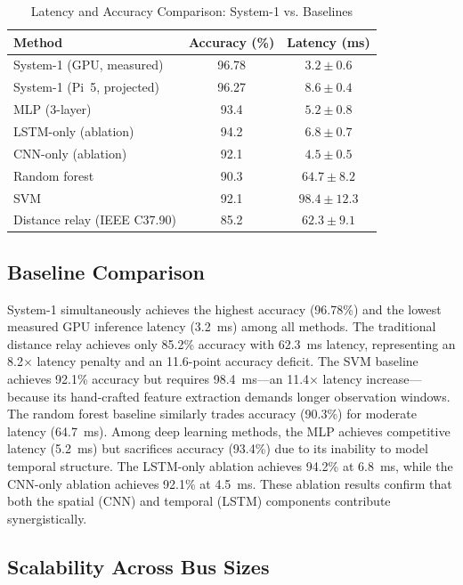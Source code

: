 \documentclass[journal]{IEEEtran}
\begin{document}
\begin{table}[!t]
\centering
\caption{Latency and Accuracy Comparison: System-1 vs. Baselines}
\label{tab:latency}
\begin{tabular}{lcc}
\toprule
\textbf{Method} & \textbf{Accuracy (\%)} & \textbf{Latency (ms)} \\
\midrule
System-1 (GPU, measured)    & 96.78 & $3.2 \pm 0.6$ \\
System-1 (Pi~5, projected)  & 96.27 & $8.6 \pm 0.4$ \\
MLP (3-layer)               & 93.4  & $5.2 \pm 0.8$ \\
LSTM-only (ablation)        & 94.2  & $6.8 \pm 0.7$ \\
CNN-only (ablation)         & 92.1  & $4.5 \pm 0.5$ \\
Random forest               & 90.3  & $64.7 \pm 8.2$ \\
SVM                         & 92.1  & $98.4 \pm 12.3$ \\
Distance relay (IEEE C37.90)& 85.2  & $62.3 \pm 9.1$ \\
\bottomrule
\end{tabular}
\end{table}

\subsection{Baseline Comparison}

System-1 simultaneously achieves the highest accuracy (96.78\%) and the lowest measured GPU inference latency (3.2~ms) among all methods. The traditional distance relay achieves only 85.2\% accuracy with 62.3~ms latency, representing an 8.2$\times$ latency penalty and an 11.6-point accuracy deficit. The SVM baseline achieves 92.1\% accuracy but requires 98.4~ms---an 11.4$\times$ latency increase---because its hand-crafted feature extraction demands longer observation windows. The random forest baseline similarly trades accuracy (90.3\%) for moderate latency (64.7~ms). Among deep learning methods, the MLP achieves competitive latency (5.2~ms) but sacrifices accuracy (93.4\%) due to its inability to model temporal structure. The LSTM-only ablation achieves 94.2\% at 6.8~ms, while the CNN-only ablation achieves 92.1\% at 4.5~ms. These ablation results confirm that both the spatial (CNN) and temporal (LSTM) components contribute synergistically.

\subsection{Scalability Across Bus Sizes}
\end{document}

